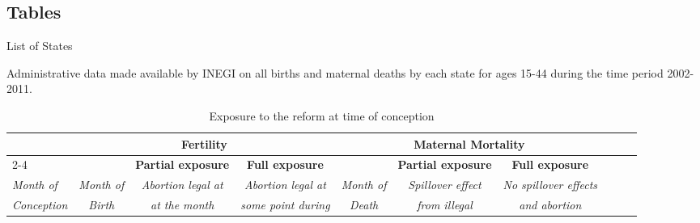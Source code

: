\documentclass[a4paper, 11pt]{article}
\renewcommand{\thetable}{A\arabic{table}}
\begin{document}
\begin{spacing}{1.4}
 
 
 \section{Tables}
 \renewcommand{\thetable}{B\arabic{table}}
\setcounter{table}{0}
 
\begin{table}[H]\caption{List of States}\label{list_of_states}
		\begin{threeparttable}
	
{\footnotesize 	\begin{tablenotes}
	\item Administrative data made available by INEGI on all births and maternal deaths by each state for ages 15-44 during the time period 2002-2011.
\end{tablenotes}}
\end{threeparttable}
\end{table}


\begin{table} \caption{Exposure to the reform at time of conception}\label{Exposure}

\centering   \begin{threeparttable}  {\small \begin{tabular}{lccccccccc}
 \hline\hline   \multirow{1}{*}{} &
 \multicolumn{3}{c}{\textbf{Fertility}} & 	\multicolumn{3}{c}{\textbf{Maternal Mortality}} \\\cline{2-4}\cline{5-7} 
 
  \multirow{2}{*}{} &&
		
		\multicolumn{1}{c}{\textbf{Partial exposure}} & 	\multicolumn{1}{c}{\textbf{Full exposure}}&&\multicolumn{1}{c}{\textbf{Partial exposure}} & 	\multicolumn{1}{c}{\textbf{Full exposure}}\\ 
		
	 
		\textit{Month of}   & \textit{Month of}  & \textit{Abortion legal at}   & \textit{Abortion legal at}  & \textit{Month of}  & \textit{Spillover effect}   & \textit{No spillover effects}\\ 
		
		\textit{Conception}& \textit{Birth}&\textit{at the month}&\textit{some point during} & \textit{Death}&\textit{from illegal  }&\textit{and abortion}\\
		

\end{tabular}}
\end{threeparttable}
\end{table}
\end{spacing}
\end{document}
